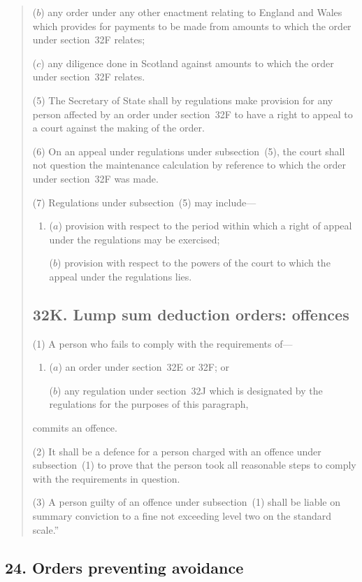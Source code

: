 \documentclass[12pt,a4paper]{article}
\begin{document}
\begin{quotation}
\begin{enumerate}
($b$) any order under any other enactment relating to England and Wales which provides for payments to be made from amounts to which the order under section~32F relates;

($c$) any diligence done in Scotland against amounts to which the order under section~32F relates.
\end{enumerate}

(5)
The Secretary of State shall by regulations make provision for any person affected by an order under section~32F to have a right to appeal to a court against the making of the order.

(6)
On an appeal under regulations under subsection~(5), the court shall not question the maintenance calculation by reference to which the order under section~32F was made.

(7)
Regulations under subsection~(5) may include---
\begin{enumerate}\item[]
($a$) provision with respect to the period within which a right of appeal under the regulations may be exercised;

($b$) provision with respect to the powers of the court to which the appeal under the regulations lies.
\end{enumerate}

\subsection*{32K. Lump sum deduction orders: offences}

(1) A person who fails to comply with the requirements of---
\begin{enumerate}\item[]
($a$) an order under section~32E or 32F; or

($b$) any regulation under section~32J which is designated by the regulations for the purposes of this paragraph,
\end{enumerate}
commits an offence.

(2)
It shall be a defence for a person charged with an offence under subsection~(1) to prove that the person took all reasonable steps to comply with the requirements in question.

(3)
A person guilty of an offence under subsection~(1) shall be liable on summary 
conviction to a fine not exceeding level two on the standard scale.''
\end{quotation}

\subsection{24. Orders preventing avoidance}
\end{document}
